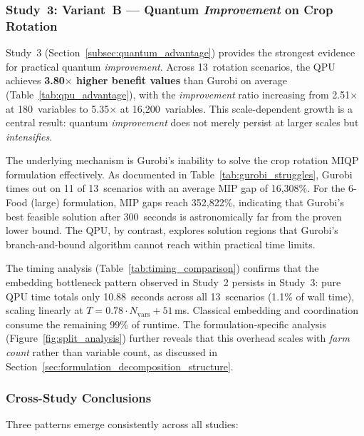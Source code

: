 \subsubsection{Study~3: Variant~B --- Quantum \textit{Improvement} on Crop Rotation}

Study~3 (Section~\ref{subsec:quantum_advantage}) provides the strongest evidence for practical quantum \textit{improvement}. Across 13~rotation scenarios, the QPU achieves \textbf{3.80$\times$ higher benefit values} than Gurobi on average (Table~\ref{tab:qpu_advantage}), with the \textit{improvement} ratio increasing from 2.51$\times$ at 180~variables to 5.35$\times$ at 16,200~variables. This scale-dependent growth is a central result: quantum \textit{improvement} does not merely persist at larger scales but \textit{intensifies}.

The underlying mechanism is Gurobi's inability to solve the crop rotation MIQP formulation effectively. As documented in Table~\ref{tab:gurobi_struggles}, Gurobi times out on 11 of 13~scenarios with an average MIP gap of 16,308\%. For the 6-Food (large) formulation, MIP gaps reach 352,822\%, indicating that Gurobi's best feasible solution after 300~seconds is astronomically far from the proven lower bound. The QPU, by contrast, explores solution regions that Gurobi's branch-and-bound algorithm cannot reach within practical time limits.

The timing analysis (Table~\ref{tab:timing_comparison}) confirms that the embedding bottleneck pattern observed in Study~2 persists in Study~3: pure QPU time totals only 10.88~seconds across all 13~scenarios (1.1\% of wall time), scaling linearly at $T = 0.78 \cdot N_{\text{vars}} + 51$\,ms. Classical embedding and coordination consume the remaining 99\% of runtime. The formulation-specific analysis (Figure~\ref{fig:split_analysis}) further reveals that this overhead scales with \textit{farm count} rather than variable count, as discussed in Section~\ref{sec:formulation_decomposition_structure}.

\subsubsection{Cross-Study Conclusions}

Three patterns emerge consistently across all studies:

